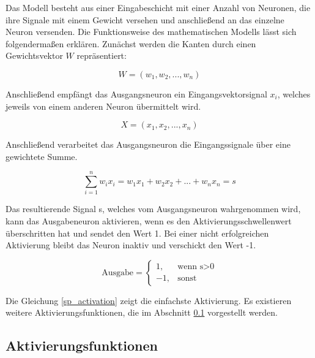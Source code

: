 \newpage
Das Modell besteht aus einer Eingabeschicht mit einer Anzahl von Neuronen, die ihre Signale mit einem Gewicht versehen und anschließend an das einzelne Neuron versenden. Die Funktionsweise des mathematischen Modells lässt sich folgendermaßen erklären. Zunächst werden die Kanten durch einen Gewichtsvektor $W$ repräsentiert:

\begin{equation}
	W = (w_1, w_2, ... , w_n)
\end{equation}

Anschließend empfängt das Ausgangsneuron ein Eingangsvektorsignal $x_i$, welches jeweils von einem anderen Neuron übermittelt wird.

\begin{equation}
X =(x_1, x_2, ... , x_n)
\end{equation}

Anschließend verarbeitet das Ausgangsneuron die Eingangssignale über eine gewichtete Summe.

\begin{equation}
	\sum_{i = 1}^{n} w_i x_i = w_1x_1 + w_2x_2 + ... + w_nx_n = s
\end{equation}

Das resultierende Signal s, welches vom Ausgangsneuron wahrgenommen wird, kann das Ausgabeneuron aktivieren, wenn es den Aktivierungsschwellenwert überschritten hat und sendet den Wert 1. Bei einer nicht erfolgreichen Aktivierung bleibt das Neuron inaktiv und verschickt den Wert -1.

\begin{equation}
\label{sp_activation}
	\text{Ausgabe} = 
	\begin{cases}
	1, & \text{wenn s$>$0}\\
	-1, & \text{sonst}
	\end{cases}
\end{equation}

Die Gleichung \ref{sp_activation} zeigt die einfachste Aktivierung. Es existieren weitere Aktivierungsfunktionen, die im Abschnitt \ref{aktivierungsfunktionen} vorgestellt werden.



\subsection{Aktivierungsfunktionen}
\label{aktivierungsfunktionen}

